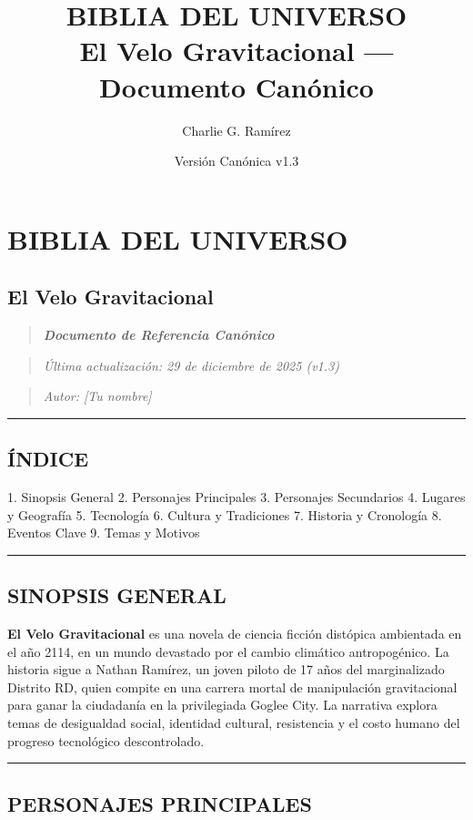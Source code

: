 \documentclass[11pt,a4paper]{report}
\title{\textbf{BIBLIA DEL UNIVERSO}\\[0.5cm]\large El Velo Gravitacional --- Documento Canónico}
\author{Charlie G. Ramírez}
\date{Versión Canónica v1.3}
\begin{document}
\maketitle
\tableofcontents
\newpage
\chapter{BIBLIA DEL UNIVERSO}
\section{El Velo Gravitacional}

\begin{quote}\textit{\textbf{Documento de Referencia Canónico}}\end{quote}
\begin{quote}\textit{Última actualización: 29 de diciembre de 2025 (v1.3)}\end{quote}
\begin{quote}\textit{Autor: [Tu nombre]}\end{quote}

\bigskip\hrule\bigskip

\section{ÍNDICE}

1. Sinopsis General
2. Personajes Principales
3. Personajes Secundarios
4. Lugares y Geografía
5. Tecnología
6. Cultura y Tradiciones
7. Historia y Cronología
8. Eventos Clave
9. Temas y Motivos

\bigskip\hrule\bigskip

\section{SINOPSIS GENERAL}

\textbf{El Velo Gravitacional} es una novela de ciencia ficción distópica ambientada en el año 2114, en un mundo devastado por el cambio climático antropogénico. La historia sigue a Nathan Ramírez, un joven piloto de 17 años del marginalizado Distrito RD, quien compite en una carrera mortal de manipulación gravitacional para ganar la ciudadanía en la privilegiada Goglee City. La narrativa explora temas de desigualdad social, identidad cultural, resistencia y el costo humano del progreso tecnológico descontrolado.

\bigskip\hrule\bigskip

\section{PERSONAJES PRINCIPALES}
\end{document}
